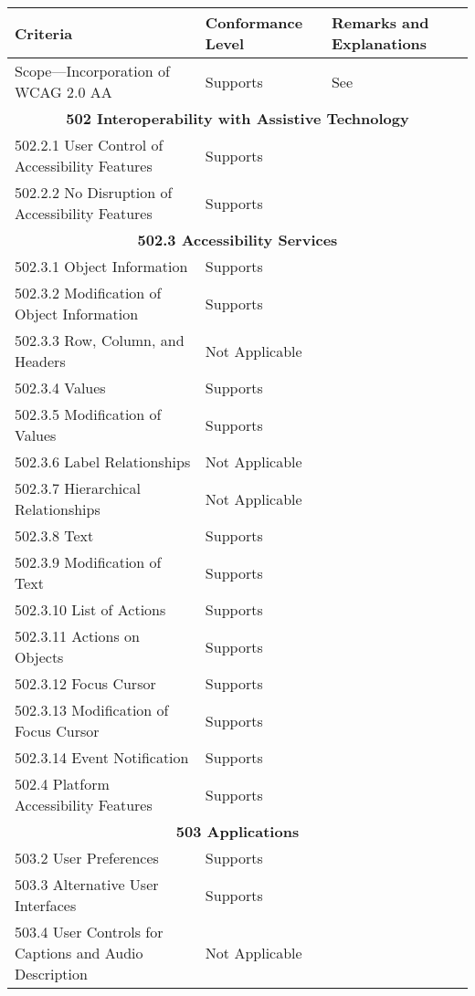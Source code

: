 \documentclass{report}
\begin{document}
\begin{longtable}{p{}<{\RaggedRight}p{}<{\RaggedRight}p{}<{\RaggedRight}}
  \toprule
  Criteria & Conformance Level & Remarks and Explanations \\
  \midrule
  \endhead
  \bottomrule
  \endfoot
  501.1 Scope---Incorporation of WCAG 2.0 AA & Supports & See
                                                          \nameref{sec:WCAG-AA}\\
  \multicolumn{3}{c}{\bfseries
  502 Interoperability with Assistive Technology}\\*
  502.2.1 User Control of Accessibility Features & Supports\\
  502.2.2 No Disruption of Accessibility Features & Supports\\
  \multicolumn{3}{c}{\bfseries 502.3 Accessibility Services}\\*
  502.3.1 Object Information & Supports\\
  502.3.2 Modification of Object Information & Supports\\
  502.3.3 Row, Column, and Headers & Not Applicable\\
  502.3.4 Values & Supports\\
  502.3.5 Modification of Values & Supports\\
  502.3.6 Label Relationships & Not Applicable\\
  502.3.7 Hierarchical Relationships & Not Applicable\\
  502.3.8 Text & Supports\\
  502.3.9 Modification of Text & Supports\\
  502.3.10 List of Actions & Supports\\
  502.3.11 Actions on Objects & Supports\\
  502.3.12 Focus Cursor & Supports\\
  502.3.13 Modification of Focus Cursor & Supports\\
  502.3.14 Event Notification & Supports\\
  502.4 Platform Accessibility Features & Supports\\
  \multicolumn{3}{c}{\bfseries 503 Applications}\\*
  503.2 User Preferences & Supports\\
  503.3 Alternative User Interfaces & Supports\\
  503.4 User Controls for Captions and Audio Description & Not
                                                           Applicable\\ 

\end{longtable}
\end{document}
